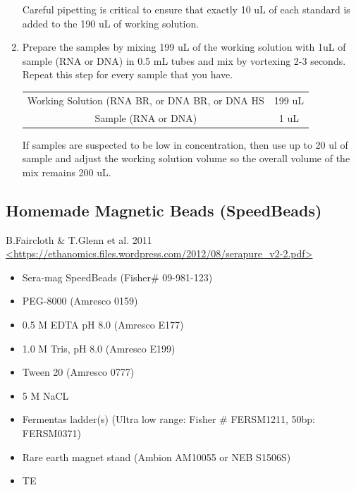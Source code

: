 \documentclass[11pt, oneside]{article}
\begin{document}
\begin{enumerate}
			 Careful pipetting is critical to ensure that exactly 10 uL of each standard is added to the 190 uL of working solution. 
		
			\item Prepare the samples by mixing 199 uL of the working solution with 1uL of sample (RNA or DNA) in 0.5 mL tubes and mix by vortexing 			2-3 seconds. Repeat this step for every sample that you have. 
		
			\begin{table}[H]
				\centering
				\begin{tabular}{| c | c |}
				\hline
				\cellcolor{gray}{\bf Reagent} & \cellcolor{gray}{\bf Number of samples 1X (uL)}  \\
				\hline
				Working Solution (RNA BR, or DNA BR, or DNA HS & 199 uL \\
				Sample (RNA or DNA) & 1 uL \\
				\hline
				\end{tabular}
			\end{table}
		
			 If samples are suspected to be low in concentration, then use up to 20 ul of sample and adjust the working solution 				volume so the overall volume of the mix remains 200 uL. 		

		\end{enumerate}
	
	\newpage 
	
	\subsection{Homemade Magnetic Beads (SpeedBeads)}
	
		B.Faircloth \& T.Glenn et al. 2011 \\
		\url{<https://ethanomics.files.wordpress.com/2012/08/serapure_v2-2.pdf>}

		\vspace{5mm}

		
		\begin{itemize}
			\itemsep0mm
			\item Sera-mag SpeedBeads (Fisher\# 09-981-123)
			\item PEG-8000 (Amresco 0159)
			\item 0.5 M EDTA pH 8.0 (Amresco E177)
			\item 1.0 M Tris, pH 8.0 (Amresco E199)
			\item Tween 20 (Amresco 0777)
			\item 5 M NaCL
			\item Fermentas ladder(s) (Ultra low range: Fisher \# FERSM1211, 50bp: FERSM0371)
			\item Rare earth magnet stand (Ambion AM10055 or NEB S1506S)
			\item TE
		\end{itemize}
\end{document}
